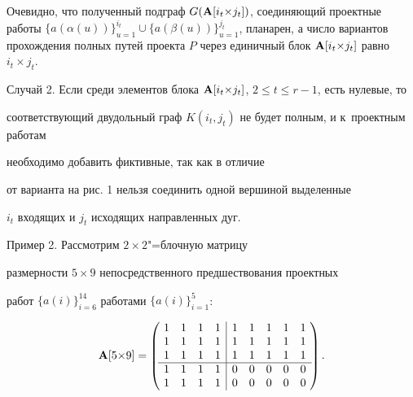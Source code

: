 
%

%






Очевидно, что полученный подграф $G({\bf A}[i_t {\times} j_t ])$, соединяющий проектные работы $\{a(\alpha(u))\}_{u=1}^{i_t }\cup

\{a(\beta (u))\}_{u=1}^{j_t}$, планарен, а число вариантов прохождения полных путей проекта $P$ через единичный блок ${\bf

A}[i_t {\times} j_t ]$ равно $i_t {\times} j_t $.





\smallskip

{\small \sc Случай 2.} Если среди элементов блока ${\bf A}[i_t

{\times} j_t ]$, $2\leqslant t\leqslant r-1$, есть нулевые, то

соответствующий двудольный граф $K(i_t, j_t )$ не будет полным, и к~проектным работам

необходимо добавить  фиктивные, так как в отличие

от варианта на рис. 1   нельзя соединить одной вершиной выделенные

$i_t $ входящих и $j_t $ исходящих направленных дуг.




\smallskip

{\small \sc Пример 2.} Рассмотрим $2{\times}2$"=блочную матрицу

размерности $5{\times}9$ непосредственного предшествования проектных

работ $\{a(i)\}_{i=6}^{14}$ работами $\{a(i)\}_{i=1}^{5}$:

\[

{\bf A}[5{\times}9]= \left(\!

\begin{array}{cccc|ccccc}

1 & 1 & 1 & 1 &  1 & 1 & 1& 1 & 1  \\

1 & 1 & 1 & 1 & 1 & 1 & 1& 1 & 1  \\

1 & 1 & 1 & 1 & 1 & 1 & 1& 1 & 1  \\

\hline

1 & 1 & 1 & 1 & 0 & 0 & 0& 0 & 0\\

1 & 1 & 1 & 1 & 0 & 0 & 0& 0 & 0

\end{array} \!\right).

\]





